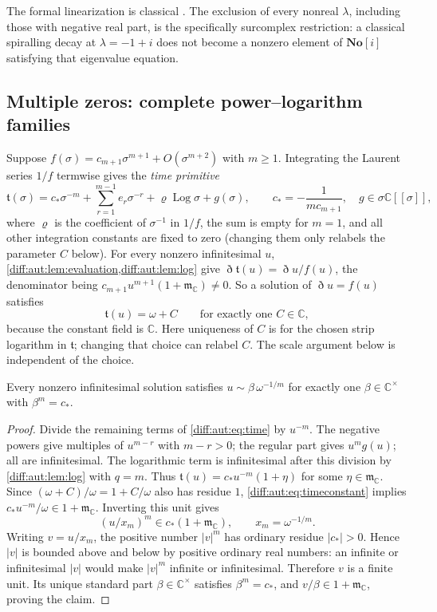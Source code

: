 \documentclass[11pt,letterpaper]{article}
\numberwithin{equation}{section}
\theoremstyle{definition}
\theoremstyle{remark}
\newcommand{\SC}{\mathbf{No}[i]}
\newcommand{\C}{\mathbb C}
\newcommand{\mm}{\mathfrak m}
\newcommand{\Dn}{\eth}
\newcommand{\Log}{\operatorname{Log}}
\begin{document}
The formal linearization is classical \cite[Lemma~6.1(i), arXiv v1]{NPT}. The exclusion of
every nonreal $\lambda$, including those with negative real part, is the
specifically surcomplex restriction: a classical spiralling decay at
$\lambda=-1+i$ does not become a nonzero element of $\SC$ satisfying that
eigenvalue equation.

\subsection{Multiple zeros: complete power--logarithm families}
\label{diff:aut:sub:multiple}

Suppose $f(\sigma)=c_{m+1}\sigma^{m+1}+O(\sigma^{m+2})$ with $m\geq1$. Integrating
the Laurent series $1/f$ termwise gives the \emph{time primitive}
\begin{equation}\label{diff:aut:eq:time}
 \mathfrak t(\sigma)=c_{\ast}\sigma^{-m}+\sum_{r=1}^{m-1}e_{r}\sigma^{-r}
 +\varrho\Log\sigma+g(\sigma),
 \qquad c_{\ast}=-\frac{1}{mc_{m+1}},\quad g\in\sigma\C[[\sigma]],
\end{equation}
where $\varrho$ is the coefficient of $\sigma^{-1}$ in $1/f$, the sum is empty
for $m=1$, and all other integration constants are fixed to zero (changing them
only relabels the parameter $C$ below). For every nonzero infinitesimal $u$,
\cref{diff:aut:lem:evaluation,diff:aut:lem:log} give
$\Dn\mathfrak t(u)=\Dn u/f(u)$, the denominator being
$c_{m+1}u^{m+1}(1+\mm_{\C})\neq0$. So a solution of $\Dn u=f(u)$ satisfies
\begin{equation}\label{diff:aut:eq:timeconstant}
 \mathfrak t(u)=\omega+C\qquad\text{for exactly one }C\in\C,
\end{equation}
because the constant field is $\C$. Here uniqueness of $C$ is for
the chosen strip logarithm in $\mathfrak t$; changing that choice
can relabel $C$. The scale argument below is independent of the choice.

\begin{lemma}
\label{diff:aut:lem:leading}
Every nonzero infinitesimal solution satisfies $u\sim\beta\,\omega^{-1/m}$ for
exactly one $\beta\in\C^{\times}$ with $\beta^{m}=c_{\ast}$.
\end{lemma}
\begin{proof}
Divide the remaining terms of \cref{diff:aut:eq:time} by
$u^{-m}$. The negative powers give multiples of $u^{m-r}$ with
$m-r>0$; the regular part gives $u^mg(u)$; all are infinitesimal.
The logarithmic term is infinitesimal after this division by
\cref{diff:aut:lem:log} with $q=m$. Thus
$\mathfrak t(u)=c_*u^{-m}(1+\eta)$ for some $\eta\in\mm_\C$.
Since $(\omega+C)/\omega=1+C/\omega$ also has residue $1$,
\cref{diff:aut:eq:timeconstant} implies
$c_*u^{-m}/\omega\in1+\mm_\C$. Inverting this unit gives
\[
 (u/x_m)^m\in c_*(1+\mm_\C),\qquad x_m=\omega^{-1/m}.
\]
Writing $v=u/x_m$, the positive number $|v|^m$ has ordinary
residue $|c_*|>0$. Hence $|v|$ is bounded above and below by
positive ordinary real numbers: an infinite or infinitesimal $|v|$
would make $|v|^m$ infinite or infinitesimal. Therefore $v$ is a
finite unit. Its unique standard part $\beta\in\C^\times$ satisfies
$\beta^m=c_*$, and $v/\beta\in1+\mm_\C$, proving the claim.
\end{proof}
\end{document}
